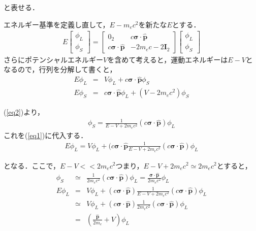 \documentclass[10pt]{ujarticle}
\begin{document}
と表せる．

エネルギー基準を定義し直して，$E-m_e c^2$を新たな$E$とする．
\begin{eqnarray}
E
\left[
\begin{array}{c}
  \phi_L \\
  \phi_S
\end{array}
\right]
=
\left[
\begin{array}{cc}
  0_2 & c \bm{\sigma} \cdot \bm{\hat{p}} \\
  c \bm{\sigma} \cdot \bm{\hat{p}} & -2m_e c-2 \bm{I}_2 
\end{array}
\right]
\left[
\begin{array}{c}
  \phi_L \\
  \phi_S
\end{array}
\right]
\end{eqnarray}
さらにポテンシャルエネルギー$V$を含めて考えると，運動エネルギーは$E-V$となるので，行列を分解して書くと，
\begin{eqnarray}
\label{eq1}
  E \phi_L &=& V \phi_L + c\bm{\sigma} \cdot \bm{\hat{p}} \phi_S \\
\label{eq2}
  E \phi_S &=& c\bm{\sigma} \cdot \bm{\hat{p}} \phi_L + (V-2m_e c^2) \phi_S 
\end{eqnarray}

(\ref{eq2})より，
\begin{eqnarray}
  \phi_S = \frac{1}{E-V+2m_e c^2} (c \bm{\sigma} \cdot \bm{\hat{p}}) \phi_L
\end{eqnarray}
これを(\ref{eq1})に代入する．
\begin{eqnarray}
  \label{eq5}
  E \phi_L = V\phi_L + (c \bm{\sigma} \cdot \bm{\hat{p}} \frac{1}{E-V+2m_e c^2} (c\bm{\sigma} \cdot \bm{\hat{p}}) \phi_L
\end{eqnarray}

となる．ここで，$E-V<<2m_e c^2$つまり，$E-V+2m_e c^2 \simeq 2m_e c^2$とすると，
\begin{eqnarray}
  \phi_S &\simeq& \frac{1}{2m_e c^2} (c \bm{\sigma} \cdot \bm{\hat{p}}) \phi_L = \frac{\bm{\sigma} \cdot \bm{\hat{p}}}{2m_e c^2} \phi_L \\
  E \phi_L &=& V \phi_L + (c \bm{\sigma} \cdot \bm{\hat{p}})\frac{1}{E-V+2m_e c^2} (c \bm{\sigma} \cdot \bm{\hat{p}}) \phi_L \nonumber \\
  &\simeq& V \phi_L + (c \bm{\sigma} \cdot \bm{\hat{p}})\frac{1}{2m_e c^2} (c \bm{\sigma} \cdot \bm{\hat{p}}) \phi_L \nonumber \\
  \label{eq3}
  &=& \left( \frac{\bm{\hat{p}}}{2m_e} + V \right) \phi_L
\end{eqnarray}
\end{document}
